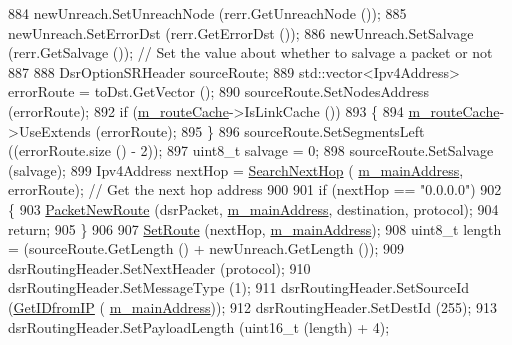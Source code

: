 \begin{DoxyCode}
884                   newUnreach.SetUnreachNode (rerr.GetUnreachNode ());
885                   newUnreach.SetErrorDst (rerr.GetErrorDst ());
886                   newUnreach.SetSalvage (rerr.GetSalvage ()); \textcolor{comment}{// Set the value about whether to salvage a
       packet or not}
887 
888                   DsrOptionSRHeader sourceRoute;
889                   std::vector<Ipv4Address> errorRoute = toDst.GetVector ();
890                   sourceRoute.SetNodesAddress (errorRoute);
892                   \textcolor{keywordflow}{if} (\hyperlink{classns3_1_1dsr_1_1DsrRouting_ac409bdb961b9fff0fb63ebd026be99ad}{m\_routeCache}->IsLinkCache ())
893                     \{
894                       \hyperlink{classns3_1_1dsr_1_1DsrRouting_ac409bdb961b9fff0fb63ebd026be99ad}{m\_routeCache}->UseExtends (errorRoute);
895                     \}
896                   sourceRoute.SetSegmentsLeft ((errorRoute.size () - 2));
897                   uint8\_t salvage = 0;
898                   sourceRoute.SetSalvage (salvage);
899                   Ipv4Address nextHop = \hyperlink{classns3_1_1dsr_1_1DsrRouting_aa1b16658c14499af76ca7dd69c034f22}{SearchNextHop} (
      \hyperlink{classns3_1_1dsr_1_1DsrRouting_a73182b5edee2d8460f28855e058fc9a0}{m\_mainAddress}, errorRoute); \textcolor{comment}{// Get the next hop address}
900 
901                   \textcolor{keywordflow}{if} (nextHop == \textcolor{stringliteral}{"0.0.0.0"})
902                     \{
903                       \hyperlink{classns3_1_1dsr_1_1DsrRouting_ae70ab39db551d1d81afc081196f78017}{PacketNewRoute} (dsrPacket, \hyperlink{classns3_1_1dsr_1_1DsrRouting_a73182b5edee2d8460f28855e058fc9a0}{m\_mainAddress}, destination, 
      protocol);
904                       \textcolor{keywordflow}{return};
905                     \}
906 
907                   \hyperlink{classns3_1_1dsr_1_1DsrRouting_a8a726fb52558a1a8172a5bd5b8cdb072}{SetRoute} (nextHop, \hyperlink{classns3_1_1dsr_1_1DsrRouting_a73182b5edee2d8460f28855e058fc9a0}{m\_mainAddress});
908                   uint8\_t length = (sourceRoute.GetLength () + newUnreach.GetLength ());
909                   dsrRoutingHeader.SetNextHeader (protocol);
910                   dsrRoutingHeader.SetMessageType (1);
911                   dsrRoutingHeader.SetSourceId (\hyperlink{classns3_1_1dsr_1_1DsrRouting_a4593e50d5f36e9b9b013fe0422067c44}{GetIDfromIP} (
      \hyperlink{classns3_1_1dsr_1_1DsrRouting_a73182b5edee2d8460f28855e058fc9a0}{m\_mainAddress}));
912                   dsrRoutingHeader.SetDestId (255);
913                   dsrRoutingHeader.SetPayloadLength (uint16\_t (length) + 4);

\end{DoxyCode}
